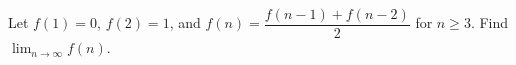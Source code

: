 Let $f(1)=0$, $f(2)=1$, and $f(n)=\dfrac{f(n-1)+f(n-2)}{2}$ for $n\ge3$. Find $\lim_{n\to\infty}f(n)$.

